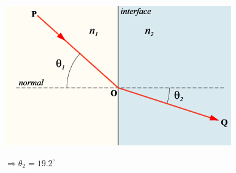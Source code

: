 \documentclass[11pt]{article}
\begin{document}
\begin{center}
\includegraphics[scale=0.65]{Images/snells_law.png}
\end{center}

$\Rightarrow \theta_2 = 19.2^\circ$


\end{document}
